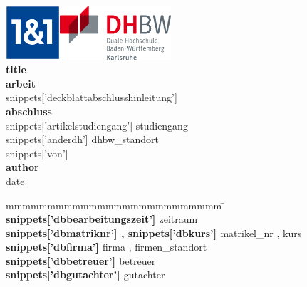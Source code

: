 
\begin{titlepage}
    \enlargethispage{20mm}
    \begin{center}
        \vspace*{-2cm}
\includegraphics[height=2cm]{images/1und1-logo}\hfill\includegraphics[height=2cm]{images/dhbw-logo}\\[2cm]
        \vspace*{12mm}  {\LARGE\bf {{ title }} }\\
        \vspace*{12mm}  {\large\bf {{ arbeit }} }\\
        \vspace*{12mm}  {{ snippets['deckblattabschlusshinleitung'] }} \\
        \vspace*{3mm}       {\bf {{ abschluss }} }\\
    \vspace*{12mm}  {{ snippets['artikelstudiengang'] }} {{ studiengang }}\\
    \vspace*{3mm}       {{ snippets['anderdh'] }} {{ dhbw_standort }}\\
        \vspace*{12mm}  {{ snippets['von'] }}\\
        \vspace*{3mm}       {\large\bf {{ author }} }\\
        \vspace*{12mm}  {{ date }}\\
    \end{center}
    \vfill
    \begin{spacing}{1.2}
    \begin{tabbing}
        mmmmmmmmmmmmmmmmmmmmmmmmmm                                         \= \kill
        \textbf{ {{ snippets['dbbearbeitungszeit'] }} }                    \>  {{ zeitraum }}\\
        \textbf{ {{ snippets['dbmatriknr'] }}, {{ snippets['dbkurs'] }} }  \>  {{ matrikel_nr }}, {{ kurs }}\\
        \textbf{ {{ snippets['dbfirma'] }} }                               \>  {{ firma }}, {{ firmen_standort }}\\
        \textbf{ {{ snippets['dbbetreuer'] }} }                            \>  {{ betreuer }}\\
        \textbf{ {{ snippets['dbgutachter'] }} }                           \>  {{ gutachter }}
    \end{tabbing}
    \end{spacing}
\end{titlepage}